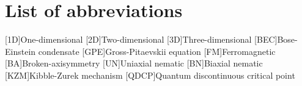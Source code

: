 \chapter*{List of abbreviations}
\begin{acronym}
    [1D]{One-dimensional}
    [2D]{Two-dimensional}
    [3D]{Three-dimensional}
    [BEC]{Bose-Einstein condensate}
    [GPE]{Gross-Pitaevskii equation}
    [FM]{Ferromagnetic}
    [BA]{Broken-axisymmetry}
    [UN]{Uniaxial nematic}
    [BN]{Biaxial nematic}
    [KZM]{Kibble-Zurek mechanism}
    [QDCP]{Quantum discontinuous critical point}
\end{acronym}